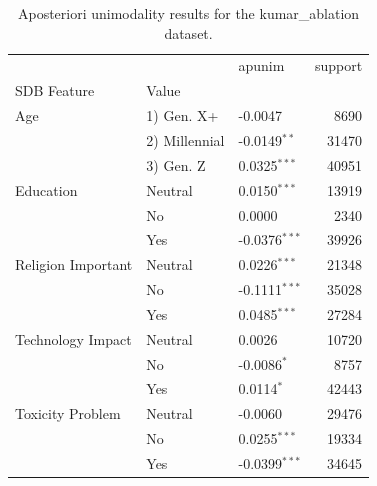\begin{table}[ht]\centering
\caption{Aposteriori unimodality results for the kumar_ablation dataset.}
\label{tab:kumar_ablation}
\begin{tabular}{lllr}
\toprule
 &  & apunim & support \\
SDB Feature & Value &  &  \\
\midrule
Age & 1) Gen. X+ & -0.0047 & 8690 \\
 & 2) Millennial & -0.0149$^{**}$ & 31470 \\
 & 3) Gen. Z & 0.0325$^{***}$ & 40951 \\
Education & Neutral & 0.0150$^{***}$ & 13919 \\
 & No & 0.0000 & 2340 \\
 & Yes & -0.0376$^{***}$ & 39926 \\
Religion Important & Neutral & 0.0226$^{***}$ & 21348 \\
 & No & -0.1111$^{***}$ & 35028 \\
 & Yes & 0.0485$^{***}$ & 27284 \\
Technology Impact & Neutral & 0.0026 & 10720 \\
 & No & -0.0086$^{*}$ & 8757 \\
 & Yes & 0.0114$^{*}$ & 42443 \\
Toxicity Problem & Neutral & -0.0060 & 29476 \\
 & No & 0.0255$^{***}$ & 19334 \\
 & Yes & -0.0399$^{***}$ & 34645 \\
\bottomrule
\end{tabular}
\end{table}
